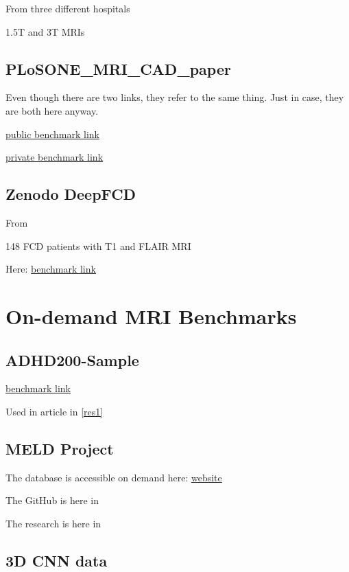 From three different hospitals

1.5T and 3T MRIs

\subsection{PLoSONE\_MRI\_CAD\_paper}
\label{dt:ul3}

Even though there are two links, they refer to the same thing. Just in case, they are both here anyway.

\href{https://figshare.com/articles/journal_contribution/PLoSONE_MRI_CAD_paper/3573471?file=5653479}{public benchmark link}

\href{https://figshare.com/s/70178bc154bd83258322?file=5653479}{private benchmark link}

\subsection{Zenodo DeepFCD}
\label{dt:res18}

From 

148 FCD patients with T1 and FLAIR MRI

Here: \href{https://zenodo.org/records/7844202}{benchmark link}

\section{On-demand MRI Benchmarks}

\subsection{ADHD200-Sample}

\href{https://fcon_1000.projects.nitrc.org/indi/adhd200/}{benchmark link}

Used in article in \ref{res1}

\subsection{MELD Project}

The database is accessible on demand here: \href{https://meldproject.github.io//}{website}

The GitHub is here in 

The research is here in 

\subsection{3D CNN data}

